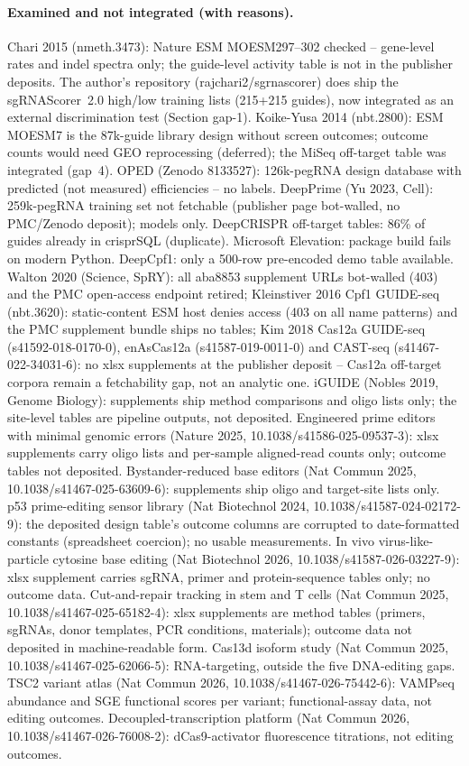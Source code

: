 \paragraph{Examined and not integrated (with reasons).}
Chari 2015 (nmeth.3473): Nature ESM MOESM297--302 checked -- gene-level
rates and indel spectra only; the guide-level activity table is not in
the publisher deposits. The author's repository (rajchari2/sgrnascorer)
does ship the sgRNAScorer~2.0 high/low training lists (215+215 guides),
now integrated as an external discrimination test (Section gap-1).
Koike-Yusa 2014 (nbt.2800): ESM MOESM7 is the 87k-guide library design
without screen outcomes; outcome counts would need GEO reprocessing
(deferred); the MiSeq off-target table was integrated (gap~4). OPED (Zenodo 8133527): 126k-pegRNA design
database with predicted (not measured) efficiencies -- no labels.
DeepPrime (Yu 2023, Cell): 259k-pegRNA training set not fetchable
(publisher page bot-walled, no PMC/Zenodo deposit); models only.
DeepCRISPR off-target tables: 86\% of guides already in crisprSQL
(duplicate). Microsoft Elevation: package build fails on modern Python.
DeepCpf1: only a 500-row pre-encoded demo table available. Walton 2020 (Science,
SpRY): all aba8853 supplement URLs bot-walled (403) and the PMC
open-access endpoint retired; Kleinstiver 2016 Cpf1 GUIDE-seq
(nbt.3620): static-content ESM host denies access (403 on all name
patterns) and the PMC supplement bundle ships no tables; Kim 2018
Cas12a GUIDE-seq (s41592-018-0170-0), enAsCas12a (s41587-019-0011-0)
and CAST-seq (s41467-022-34031-6): no xlsx supplements at the publisher
deposit -- Cas12a off-target corpora remain a fetchability gap, not an
analytic one. iGUIDE (Nobles 2019, Genome Biology):
supplements ship method comparisons and oligo lists only; the
site-level tables are pipeline outputs, not deposited. Engineered prime editors with minimal genomic errors (Nature 2025,
10.1038/s41586-025-09537-3): xlsx supplements carry oligo lists and
per-sample aligned-read counts only; outcome tables not deposited.
Bystander-reduced base editors (Nat Commun 2025,
10.1038/s41467-025-63609-6): supplements ship oligo and target-site
lists only. p53 prime-editing sensor library (Nat Biotechnol
2024, 10.1038/s41587-024-02172-9): the deposited design table's
outcome columns are corrupted to date-formatted constants
(spreadsheet coercion); no usable measurements. In vivo virus-like-particle
cytosine base editing (Nat Biotechnol 2026, 10.1038/s41587-026-03227-9):
xlsx supplement carries sgRNA, primer and protein-sequence tables
only; no outcome data. Cut-and-repair
tracking in stem and T cells (Nat Commun 2025,
10.1038/s41467-025-65182-4): xlsx supplements are method tables
(primers, sgRNAs, donor templates, PCR conditions, materials); outcome
data not deposited in machine-readable form. Cas13d isoform study
(Nat Commun 2025, 10.1038/s41467-025-62066-5): RNA-targeting, outside
the five DNA-editing gaps. TSC2 variant atlas
(Nat Commun 2026, 10.1038/s41467-026-75442-6): VAMPseq abundance and
SGE functional scores per variant; functional-assay data, not editing
outcomes. Decoupled-transcription
platform (Nat Commun 2026, 10.1038/s41467-026-76008-2): dCas9-activator
fluorescence titrations, not editing outcomes.
